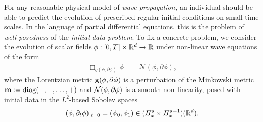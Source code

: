 
For any reasonable physical model of \textit{wave propagation}, an individual should be able to predict the evolution of prescribed regular initial conditions on small time scales. In the language of partial differential equations, this is the problem of \textit{well-posedness} of the \textit{initial data problem}. To fix a concrete problem, we consider the evolution of scalar fields $\phi : [0, T] \times \mathbb R^d \to \mathbb R$ under non-linear wave equations of the form
\begin{equation}\label{eq:NLW}\tag{NLW}
	\begin{split}
		\Box_{g(\phi, \partial \phi)} \phi 
			&= \mathcal N(\phi, \partial\phi), 
	\end{split}
\end{equation}
where the Lorentzian metric ${\bf g}(\phi, \partial\phi)$ is a perturbation of the Minkowski metric ${\bf m} := \operatorname{diag} (-, +, \dots, +)$ and $\mathcal N(\phi, \partial\phi)$ is a smooth non-linearity, posed with initial data in the $L^2$-based Sobolev spaces
	\[
		(\phi, \partial_t \phi)_{|t = 0} 
			= (\phi_0, \phi_1) \in (H^s_x \times H^{s - 1}_x) (\mathbb R^d).
	\]

